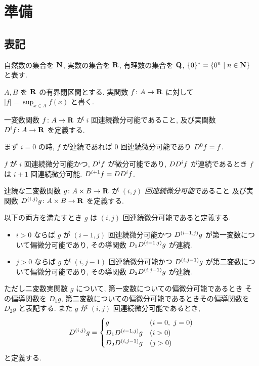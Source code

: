 \section{準備}
\label{section: preliminaries}

\subsection{表記}
自然数の集合を $\mathbf N$, 実数の集合を $\mathbf R$, 
有理数の集合を $\mathbf Q$, $\{0\}^* = \{0^n \mid n \in \mathbf N\}$ と表す.

$A, B$ を $\mathbf R$ の有界閉区間とする. 
実関数 $f \colon A \to \mathbf R$ に対して $|f| = \sup_{x \in A} f(x)$ と書く.

一変数関数 $f\colon A \to \mathbf R$ が $i$ 回連続微分可能であること,
及び実関数 $D^i f \colon A \to \mathbf R$ を定義する.

まず $i = 0$ の時, $f$ が連続であれば
$0$ 回連続微分可能であり $D^0 f = f$.

$f$ が $i$ 回連続微分可能かつ,
$D^i f$ が微分可能であり,
$D D^i f$ が連続であるとき $f$ は $i+1$ 回連続微分可能.
$D^{i+1} f = D D^i f$.


連続な二変数関数 $g \colon A \times B \to \mathbf R$ が
\emph{$(i, j)$ 回連続微分可能}であること
及び実関数 $D^{(i,j)} g \colon A \times B \to \mathbf R$ を定義する.

以下の両方を満たすとき
$g$ は $(i, j)$ 回連続微分可能であると定義する.
\begin{itemize}
 \item $i>0$ ならば $g$ が $(i-1, j)$ 回連続微分可能かつ
       $D^{(i-1, j)} g$ が第一変数について偏微分可能であり,
       その導関数 $D_1 D^{(i-1, j)} g$ が連続.
 \item $j>0$ ならば $g$ が $(i, j-1)$ 回連続微分可能かつ
       $D^{(i, j-1)} g$ が第二変数について偏微分可能であり,
       その導関数 $D_2 D^{(i, j-1)} g$ が連続.
\end{itemize}
ただし二変数実関数 $g$ について, 第一変数についての偏微分可能であるとき
その偏導関数を $D_1 g$,
第二変数についての偏微分可能であるときその偏導関数を $D_2 g$ と表記する.
また $g$ が $(i, j)$ 回連続微分可能であるとき,
\begin{equation}
 D^{(i, j)} g = 
  \begin{cases}
   g & (i = 0,\ j = 0)
   \\
   D_1 D^{(i-1, j)} g & (i > 0)
   \\
   D_2 D^{(i, j-1)} g & (j > 0)
  \end{cases}
\end{equation}
と定義する.

